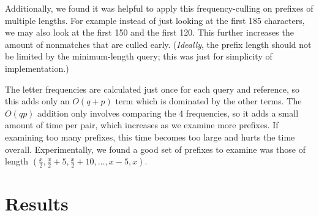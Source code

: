 \documentclass[11pt,letterpaper]{article}
\begin{document}
Additionally, we found it was helpful to apply this frequency-culling on prefixes of multiple lengths. For example instead of just looking at the first 185 characters, we may also look at the first 150 and the first 120. This further increases the amount of nonmatches that are culled early. (\emph{Ideally}, the prefix length should not be limited by the minimum-length query; this was just for simplicity of implementation.)

The letter frequencies are calculated just once for each query and reference, so this adds only an $O(q+p)$ term which is dominated by the other terms. The $O(qp)$ addition only involves comparing the 4 frequencies, so it adds a small amount of time per pair, which increases as we examine more prefixes. If examining too many prefixes, this time becomes too large and hurts the time overall. Experimentally, we found a good set of prefixes to examine was those of length $(\frac{x}{2},\frac{x}{2}+5,\frac{x}{2}+10,\dots,x-5,x)$.



\section{Results}

\maketitle
\end{document}
